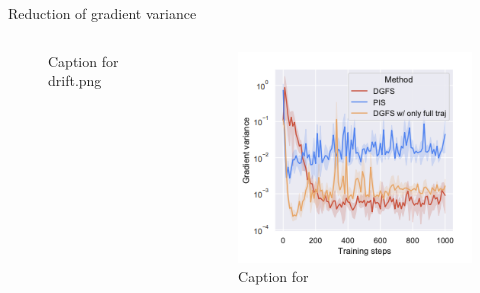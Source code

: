 \documentclass[aspectratio=169,xcolor=dvipsnames]{beamer}
\begin{document}
\begin{frame}[t]{Reduction of gradient variance}
\begin{columns}[t]
\begin{column}{0.33\textwidth}
\begin{figure}
    \caption{Caption for drift.png}
\end{figure}
\end{column}
\begin{column}{0.33\textwidth}
\begin{figure}
    \centering
    \includegraphics[width=\textwidth]{figures/grad_variance_2.png}
    \caption{Caption for }
\end{figure}
\end{column}
\end{columns}

\end{frame}
\end{document}
